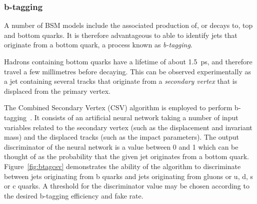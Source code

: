 \subsubsection{b-tagging}
\label{sec:detector-btagging}




A number of BSM models include the associated production of, or decays to, top 
and bottom quarks. It is therefore advantageous to able to identify jets that 
originate from a bottom quark, a process known as \textit{b-tagging}.

Hadrons containing bottom quarks have a lifetime of about 1.5~ps, and therefore 
travel a few millimetres before decaying. This can be observed experimentally 
as a jet containing several tracks that originate from a \textit{secondary 
vertex} that is displaced from the primary vertex.

The Combined Secondary Vertex (CSV) algorithm is employed to perform 
b-tagging~\cite{btagging}. It consists of an artificial neural network taking a 
number of input variables related to the secondary vertex (such as the 
displacement and invariant mass) and the displaced tracks (such as the impact 
parameters). The output discriminator of the neural network is a value between 
0 and 1 which can be thought of as the probability that the given jet 
originates from a bottom quark. Figure~\ref{fig:btagcsv} demonstrates the 
ability of the algorithm to discriminate between jets originating from b quarks 
and jets originating from gluons or u, d, s or c quarks. A threshold for the 
discriminator value may be chosen according to the desired b-tagging efficiency 
and fake rate.

